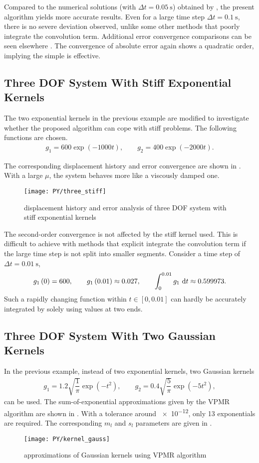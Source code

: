 Compared to the numerical solutions (with $\Delta{}t=\SI{0.05}{\second}$) obtained by \citet{Cortes2009}, the present algorithm yields more accurate results. Even for a large time step $\Delta{}t=\SI{0.1}{\second}$, there is no severe deviation observed, unlike some other methods \citep{Puthanpurayil2014,Liu2014} that poorly integrate the convolution term. Additional error convergence comparisons can be seen elsewhere \citep{Liu2023}. The convergence of absolute error again shows a quadratic order, implying the simple  is effective.
\subsection{Three DOF System With Stiff Exponential Kernels}
The two exponential kernels in the previous example are modified to investigate whether the proposed algorithm can cope with stiff problems. The following functions are chosen.
\begin{gather}
g_1=600\exp\left(-1000t\right),\qquad
g_2=400\exp\left(-2000t\right).
\end{gather}

The corresponding displacement history and error convergence are shown in . With a large $\mu$, the system behaves more like a viscously damped one.
\begin{figure}[H]
\centering
\texttt{[image: PY/three\_stiff]}
\caption{displacement history and error analysis of three DOF system with stiff exponential kernels}\label{fig:three_stiff}
\end{figure}
The second-order convergence is not affected by the stiff kernel used. This is difficult to achieve with methods that explicit integrate the convolution term if the large time step is not split into smaller segments. Consider a time step of $\Delta{}t=\SI{0.01}{\second}$,
\begin{gather}
g_1\left(0\right)=600,\qquad
g_1\left(0.01\right)\approx\num{0.027},\qquad\int_{0}^{0.01}g_1~\mathrm{d}t\approx0.599973.
\end{gather}
Such a rapidly changing function within $t\in[0,0.01]$ can hardly be accurately integrated by solely using values at two ends.
\subsection{Three DOF System With Two Gaussian Kernels}
In the previous example, instead of two exponential kernels, two Gaussian kernels
\begin{gather}
g_1=1.2\sqrt{\dfrac{1}{\pi}}\exp\left(-t^2\right),\qquad
g_2=0.4\sqrt{\dfrac{5}{\pi}}\exp\left(-5t^2\right),
\end{gather}
can be used. The sum-of-exponential approximations given by the VPMR algorithm are shown in . With a tolerance around \num{e-12}, only \num{13} exponentials are required. The corresponding $m_l$ and $s_l$ parameters are given in .
\begin{figure}[H]
\centering
\texttt{[image: PY/kernel\_gauss]}
\caption{approximations of Gaussian kernels using VPMR algorithm}\label{fig:vpmr}
\end{figure}

